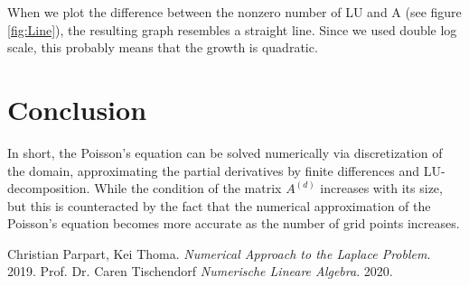 \documentclass[refman]{article}
\theoremstyle{definition}
\begin{document}
When we plot the difference between the nonzero number of LU and A (see figure \ref{fig:Line}), the resulting graph resembles a straight line. Since we used double log scale, this probably means that the growth is quadratic.

\section{Conclusion}

In short, the Poisson's equation can be solved numerically via discretization of the domain, approximating the partial derivatives by finite differences and LU-decomposition. While the condition of the matrix \(A^{(d)}\) increases with its size, but this is counteracted by the fact that the numerical approximation of the Poisson's equation becomes more accurate as the number of grid points increases.

\begin{thebibliography}{9}
	Christian Parpart, Kei Thoma. 
	\textit{Numerical Approach to the Laplace Problem}. 
	2019.
	Prof. Dr. Caren Tischendorf
	\textit{Numerische Lineare Algebra}.
	2020.
\end{thebibliography}
\end{document}
